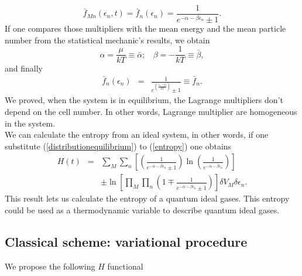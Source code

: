 \documentclass{article}
\begin{document}
\begin{equation}
    \bar f_{Mn}(\epsilon_{n},t)=\bar f_n(\epsilon_{n}) =\frac{1}{e^{-\alpha-\beta \epsilon_n}\pm 1}.
\end{equation}{}
If one compares those multipliers with the mean energy and the mean particle number from the statistical mechanic's results, we obtain
\begin{equation}
    \alpha=\frac{\mu}{kT}\equiv \bar{\alpha}; \ \ \ \ \beta=-\frac{1}{kT}\equiv \bar{\beta},
\end{equation}{}
and finally
\begin{eqnarray}
    \bar{f}_{n}(\epsilon_{n})&=&\frac{1}{e^{(\frac{{\epsilon_n}-\bar{\mu}}{kT})}\pm 1}\equiv \bar{f}_{n}.
\end{eqnarray}{}
We proved, when the system is in equilibrium, the Lagrange multipliers don't depend on the cell number. In other words, Lagrange multiplier are homogeneous in the system.\\
We can calculate the entropy from an ideal system, in other words, if one substitute (\ref{distributionequilibrium}) to (\ref{entropy}) one obtains
\begin{eqnarray}
      H(t)&=&\sum_M \sum_n  \left[\left(\frac{1}{e^{-\bar{\alpha}-\bar{\beta}\epsilon_{n}}\pm 1} \right)\ln \left(\frac{1}{e^{-\bar{\alpha}-\bar{\beta}\epsilon_{n}}} \right) \right]\nonumber \\
      &&\pm  \ln \left[\prod_{M} \prod_{n}\left(1 \mp \frac{1}{e^{-\bar{\alpha}-\bar{\beta}\epsilon_{n}}\pm 1} \right) \right]\delta V_M \delta \epsilon_n\label{H-entropy}.
  \end{eqnarray}
  This result lets us calculate the entropy of a quantum ideal gases. This entropy could be used as a thermodynamic variable to describe quantum ideal gases.
\subsection{Classical scheme: variational procedure}
We propose the following $H$ functional
\end{document}
